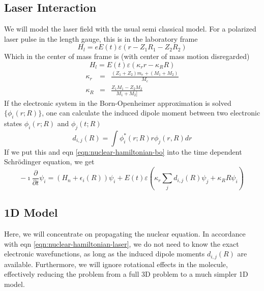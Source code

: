 \documentclass[a4paper]{article}
\begin{document}
\subsection{Laser Interaction}
We will model the laser field with the usual semi classical model. For a polarized laser pulse in 
the length gauge, this is in the laboratory frame
\begin{equation}
 H_l = e E(t) \varepsilon ( r - Z_1 R_1 - Z_2 R_2)
\end{equation}
Which in the center of mass frame is (with center of mass motion disregarded)
\begin{equation}
 H_l = E(t) \varepsilon ( \kappa_r r - \kappa_R R )
\end{equation}
\begin{eqnarray}
	\kappa_r &=& \frac{(Z_1 + Z_2) m_e + (M_1 + M_2)}{M_c} \\
	\kappa_R &=& \frac{Z_1 M_1 - Z_2 M_2}{M_1 + M_2]}
\end{eqnarray}
If the electronic system in the Born-Openheimer approximation is solved $\{ \phi_i(r; R) \}$, one can calculate the induced dipole moment 
between two electronic states $\phi_i(r; R)$ and $\phi_j(t; R)$
\begin{equation}
	d_{i,j}(R) = \int \phi_i^*(r; R) r \phi_j(r, R) dr
\end{equation}
If we put this and eqn \ref{eqn:nuclear-hamiltonian-bo} into the time dependent Schrödinger equation, we get
\begin{equation}
	\label{eqn:nuclear-hamiltonian-laser}
 - \imath \frac{\partial}{\partial t} \psi_i = \left( H_n + \epsilon_i(R) \right) \psi_i + E(t) \varepsilon \left( \kappa_r \sum_j d_{i, j}(R) \psi_j + \kappa_R R \psi_i\right)
\end{equation}

\subsection{1D Model}
Here, we will concentrate on propagating the nuclear equation. In accordance with eqn \ref{eqn:nuclear-hamiltonian-laser}, we do not need to know the exact electronic wavefunctions, as long as the induced dipole moments $d_{i,j}(R)$ are available. Furthermore, we will ignore rotational effects in the molecule, effectively reducing the problem from a full 3D problem to a much simpler 1D model.
\end{document}
